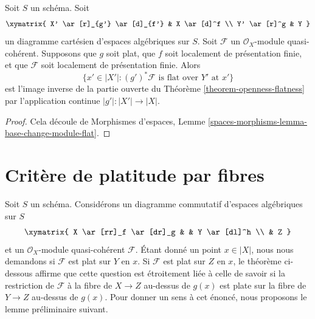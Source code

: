 \begin{lemma}
\label{lemma-flat-locus-base-change}
Soit $S$ un schéma. Soit
$$
\xymatrix{
X' \ar[r]_{g'} \ar[d]_{f'} & X \ar[d]^f \\
Y' \ar[r]^g & Y
}
$$
un diagramme cartésien d'espaces algébriques sur $S$.
Soit $\mathcal{F}$ un $\mathcal{O}_X$-module quasi-cohérent.
Supposons que $g$ soit plat, que $f$ soit localement de présentation finie,
et que $\mathcal{F}$ soit localement de présentation finie.
Alors
$$
\{x' \in |X'| : (g')^*\mathcal{F}\text{ is flat over }Y'\text{ at }x'\}
$$
est l'image inverse de la partie ouverte du
Théorème \ref{theorem-openness-flatness}
par l'application continue $|g'| : |X'| \to |X|$.
\end{lemma}

\begin{proof}
Cela découle de
Morphismes d'espaces, Lemme
\ref{spaces-morphisms-lemma-base-change-module-flat}.
\end{proof}












\section{Crit\`ere de platitude par fibres}
\label{section-criterion-flat-fibres}

\noindent
Soit $S$ un schéma. Considérons un diagramme commutatif d'espaces algébriques
sur $S$
$$
\xymatrix{
X \ar[rr]_f \ar[dr]_g & & Y \ar[dl]^h \\
& Z
}
$$
et un $\mathcal{O}_X$-module quasi-cohérent $\mathcal{F}$.
Étant donné un point $x \in |X|$, nous nous demandons si
$\mathcal{F}$ est plat sur $Y$ en $x$. Si $\mathcal{F}$ est plat
sur $Z$ en $x$, le théorème ci-dessous affirme que cette question est
étroitement liée à celle de savoir si la restriction de
$\mathcal{F}$ à la fibre de $X \to Z$ au-dessus de $g(x)$
est plate sur la fibre de $Y \to Z$ au-dessus de $g(x)$. Pour donner un sens
à cet énoncé, nous proposons le lemme préliminaire suivant.

